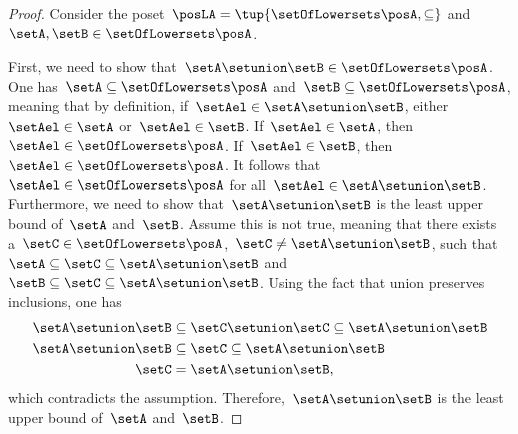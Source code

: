 \begin{proof}
    Consider the poset~$\posLA=\tup{\setOfLowersets \posA,\subseteq}$ and~$\setA,\setB\in \setOfLowersets \posA$.

    First, we need to show that~$\setA\setunion \setB\in \setOfLowersets \posA$.
    One has~$\setA \subseteq \setOfLowersets \posA$ and~$\setB\subseteq \setOfLowersets \posA$, meaning that by definition, if~$\setAel\in \setA\setunion \setB$, either~$\setAel\in \setA$ or~$\setAel\in \setB$.
    If~$\setAel\in \setA$, then~$\setAel\in \setOfLowersets \posA$.
    If~$\setAel\in \setB$, then~$\setAel\in \setOfLowersets \posA$.
    It follows that~$\setAel\in \setOfLowersets \posA$ for all~$\setAel\in \setA\setunion \setB$.
    Furthermore, we need to show that~$\setA\setunion \setB$ is the least upper bound of~$\setA$ and~$\setB$.
    Assume this is not true, meaning that there exists a~$\setC\in \setOfLowersets \posA$,~$\setC\neq \setA\setunion \setB$, such that~$\setA\subseteq \setC\subseteq \setA\setunion \setB$ and~$\setB\subseteq \setC\subseteq \setA\setunion \setB$.
    Using the fact that union preserves inclusions, one has
    \begin{equation}
        \begin{aligned}
            \setA\setunion \setB & \subseteq \setC\setunion \setC \subseteq \setA\setunion \setB \\
            \setA\setunion \setB & \subseteq \setC \subseteq \setA\setunion \setB                \\
            \setC                & = \setA\setunion \setB,
        \end{aligned}
    \end{equation}
    which contradicts the assumption.
    Therefore,~$\setA\setunion \setB$ is the least upper bound of~$\setA$ and~$\setB$.


\end{proof}
